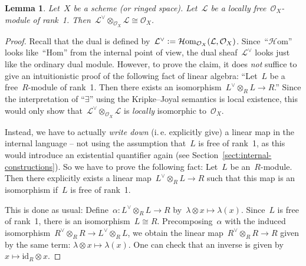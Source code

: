 \documentclass[10pt]{amsart}
\makeatletter
\theoremstyle{definition}
\theoremstyle{plain}
\newtheorem{lemma}[defn]{Lemma}
\theoremstyle{remark}
\renewcommand{\O}{\mathcal{O}}
\renewcommand{\L}{\mathcal{L}}
\newcommand{\Hom}{\mathrm{Hom}}
\newcommand{\HOM}{\mathcal{H}\mathrm{om}}
\newcommand{\id}{\mathrm{id}}
\newcommand{\?}{\,{:}\,}
\renewcommand{\_}{\mathpunct{.}\,}
\newcommand{\ie}{i.\,e.\@\xspace}
\newcommand{\defeq}{\vcentcolon=}
\makeatother
\begin{document}
\begin{lemma}Let~$X$ be a scheme (or ringed space). Let~$\L$ be a locally
free~$\O_X$-module of rank~1. Then~$\L^\vee \otimes_{\O_X} \L \cong \O_X$.\end{lemma}
\begin{proof}Recall that the dual is defined by~$\L^\vee \defeq
\HOM_{\O_X}(\L,\O_X)$. Since~``$\HOM$'' looks like~``$\Hom$'' from the internal
point of view, the dual sheaf~$\L^\vee$ looks just like the ordinary dual
module. However, to prove the claim, it does \emph{not} suffice to give an
intuitionistic proof of the following fact of linear algebra: ``Let~$L$ be a
free~$R$-module of rank~1. Then there exists an isomorphism~$L^\vee \otimes_R L
\to R$.'' Since the interpretation of ``$\exists$'' using the Kripke--Joyal
semantics is local existence, this would only show that~$\L^\vee \otimes_{\O_X}
\L$ is \emph{locally} isomorphic to~$\O_X$.

Instead, we have to actually \emph{write down} (\ie explicitly give) a
linear map in the internal language -- not using the assumption that~$L$ is
free of rank~1, as this would introduce an existential quantifier again (see
Section~\ref{sect:internal-constructions}).
So we have to prove the following fact: Let~$L$ be an~$R$-module. Then there
explicitly exists a linear map~$L^\vee \otimes_R L \to R$ such that this map is
an isomorphism if~$L$ is free of rank~1.

This is done as usual: Define~$\alpha : L^\vee \otimes_R L \to R$ by~$\lambda
\otimes x \mapsto \lambda(x)$. Since~$L$ is free of rank~1, there is an
isomorphism~$L \cong R$. Precomposing~$\alpha$
with the induced isomorphism~$R^\vee \otimes_R R \to L^\vee \otimes_R L$,
we obtain the linear map~$R^\vee \otimes_R R \to R$ given by the same
term: $\lambda \otimes x \mapsto \lambda(x)$. One can check that an inverse is given
by~$x \mapsto \id_R \otimes x$.
\end{proof}
\end{document}
